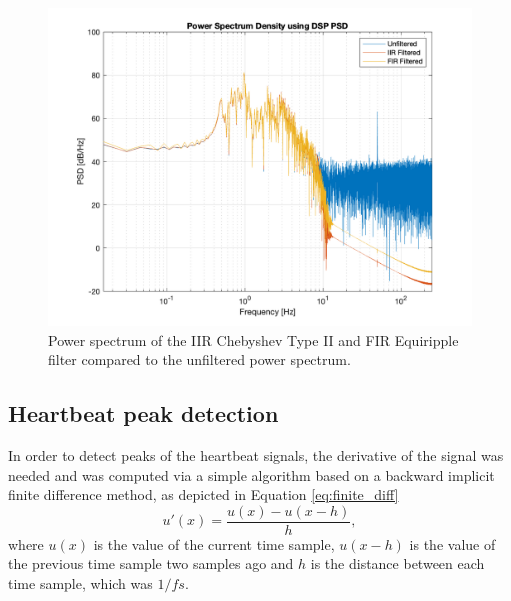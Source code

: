 \begin{figure}
	\centering
	\includegraphics[width=\linewidth, trim={2.5cm, 1cm, 2cm, 1cm}, clip]{Figures/powerspectra.png}
	\caption{Power spectrum of the IIR Chebyshev Type II and FIR Equiripple filter compared to the unfiltered power spectrum.}
	\label{fig:powerspectra}
\end{figure}


\subsection{Heartbeat peak detection}
In order to detect peaks of the heartbeat signals, the derivative of the signal was needed and was computed via a simple algorithm based on a backward implicit finite difference method, as depicted in Equation \eqref{eq:finite_diff}
\begin{equation}\label{eq:finite_diff}
	u'(x) = \frac{u(x) - u(x-h)}{h},
\end{equation}
where $u(x)$ is the value of the current time sample, $u(x-h)$ is the value of the previous time sample two samples ago and $h$ is the distance between each time sample, which was $1/fs$. 

